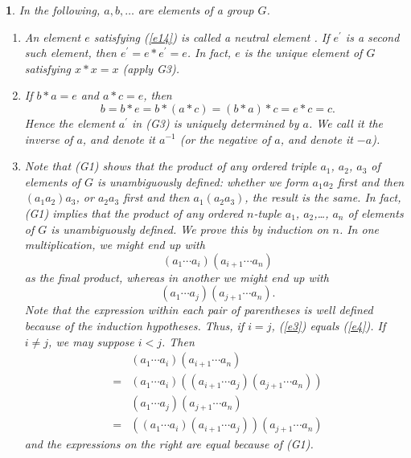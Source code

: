 \documentclass[a4paper,11pt,final]{memoir}%
\newtheorem{plain}[X]{}
\theoremstyle{nonumberplain}
\begin{document}
\begin{plain}
\label{bd2}In the following, $a,b,\ldots$ are elements of a group $G$.

\begin{enumerate}
\item An element $e$ satisfying (\ref{e14}) is called a \emph{neutral element}%
%
. If $e^{\prime}$ is a second such element, then $e^{\prime}=e\ast e^{\prime
}=e$. In fact, $e$ is the unique element of $G$ satisfying $x\ast x=x$ (apply G3).

\item If $b\ast a=e$ and $a\ast c=e$, then
\[
b=b\ast e=b\ast(a\ast c)=(b\ast a)\ast c=e\ast c=c.
\]
Hence the element $a^{\prime}$ in (G3) is uniquely determined by $a$. We call
it the \emph{inverse\/}%
of $a$, and denote it $a^{-1}$ (or the \emph{negative\/}%
of $a$, and denote it $-a$).

\item Note that (G1) shows that the product of any ordered triple $a_{1}$,
$a_{2}$, $a_{3}$ of elements of $G$ is unambiguously defined: whether we form
$a_{1}a_{2}$ first and then $(a_{1}a_{2})a_{3}$, or $a_{2}a_{3}$ first and
then $a_{1}(a_{2}a_{3})$, the result is the same. In fact, (G1) implies that
the product of any ordered $n$-tuple $a_{1}$, $a_{2}$,\ldots, $a_{n}$ of
elements of $G$ is unambiguously defined. We prove this by induction on $n$.
In one multiplication, we might end up with%
\begin{equation}
(a_{1}\cdots a_{i})(a_{i+1}\cdots a_{n}) \label{e3}%
\end{equation}
as the final product, whereas in another we might end up with%
\begin{equation}
(a_{1}\cdots a_{j})(a_{j+1}\cdots a_{n}). \label{e4}%
\end{equation}
Note that the expression within each pair of parentheses is well defined
because of the induction hypotheses. Thus, if $i=j$, (\ref{e3}) equals
(\ref{e4}). If $i\neq j$, we may suppose $i<j$. Then%
\begin{align*}
  &(a_{1}\cdots a_{i})(a_{i+1}\cdots a_{n}) \\
  =&(a_{1}\cdots a_{i})\left(
(a_{i+1}\cdots a_{j})(a_{j+1}\cdots a_{n})\right) \\
 &(a_{1}\cdots a_{j})(a_{j+1}\cdots a_{n})  \\
  =&\left(  (a_{1}\cdots
a_{i})(a_{i+1}\cdots a_{j})\right)  (a_{j+1}\cdots a_{n})
\end{align*}
and the expressions on the right are equal because of (G1).


\end{enumerate}
\end{plain}
\end{document}
